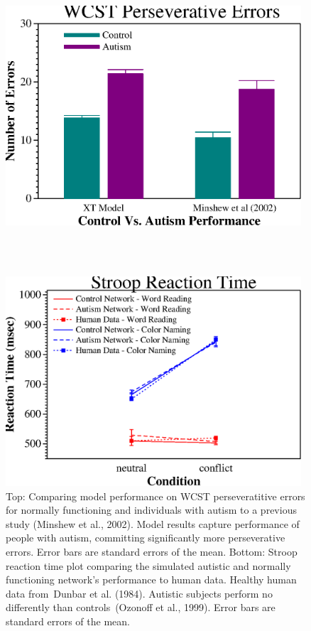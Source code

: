 \documentclass[man]{apa}
\begin{document}
\begin{figure}
\begin{center}
	\includegraphics[width=110mm]{graphs/wcst.ps}
                                                                
\textcolor{white}{\\--------------------------------\\}

	\includegraphics[width=110mm]{graphs/stroop.ps}
\end{center}
\caption{Top: Comparing model performance on WCST perseveratitive errors for normally functioning and individuals with autism to a previous study (Minshew et al., 2002). Model results capture performance of people with autism, committing significantly more perseverative errors. Error bars are standard errors of the mean.  Bottom: Stroop reaction time plot comparing the simulated autistic and normally functioning network's performance to human data. Healthy human data from~Dunbar et al. (1984).  Autistic subjects perform no differently than controls~(Ozonoff et al., 1999).  Error bars are standard errors of the mean.} 
\label{wcst-figure}
\end{figure} 
\end{document}
